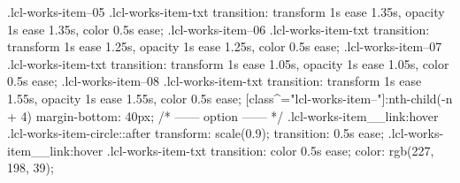{{	}
	.lcl-works-item--05 .lcl-works-item-txt {
		transition: transform 1s ease 1.35s, opacity 1s ease 1.35s,
			color 0.5s ease;
	}
	.lcl-works-item--06 .lcl-works-item-txt {
		transition: transform 1s ease 1.25s, opacity 1s ease 1.25s,
			color 0.5s ease;
	}
	.lcl-works-item--07 .lcl-works-item-txt {
		transition: transform 1s ease 1.05s, opacity 1s ease 1.05s,
			color 0.5s ease;
	}
	.lcl-works-item--08 .lcl-works-item-txt {
		transition: transform 1s ease 1.55s, opacity 1s ease 1.55s,
			color 0.5s ease;
	}
	[class^="lcl-works-item--"]:nth-child(-n + 4) {
		margin-bottom: 40px;
	}
	/* ------ option ------ */
	.lcl-works-item__link:hover .lcl-works-item-circle::after {
		transform: scale(0.9);
		transition: 0.5s ease;
	}
	.lcl-works-item__link:hover .lcl-works-item-txt {
		transition: color 0.5s ease;
		color: rgb(227, 198, 39);
	}
}
